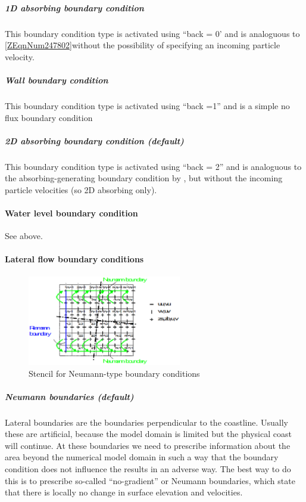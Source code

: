 \subparagraph{1D absorbing boundary condition }

This boundary condition type is activated using ``back = 0' and is analoguous to \eqref{ZEqnNum247802}without the possibility of specifying an incoming particle velocity.

\subparagraph{Wall boundary condition}

This boundary condition type is activated using ``back =1'' and is a simple no flux boundary condition

\subparagraph{2D absorbing boundary condition (default)}

This boundary condition type is activated using ``back = 2'' and is analoguous to the absorbing-generating boundary condition by \citet{VanDongeren1997}, but without the incoming particle velocities (so 2D absorbing only). 

\paragraph{Water level boundary condition}

See above.

\paragraph{Lateral flow boundary conditions}

\begin{figure}[h]
  \centering
  \includegraphics[width=0.6\textwidth]{image16}
  \caption{Stencil for Neumann-type boundary conditions}
  \label{fig:image16}
\end{figure}

\subparagraph{Neumann boundaries (default)}

Lateral boundaries are the boundaries perpendicular to the coastline. Usually these are artificial, because the model domain is limited but the physical coast will continue. At these boundaries we need to prescribe information about the area beyond the numerical model domain in such a way that the boundary condition does not influence the results in an adverse way. The best way to do this is to prescribe so-called ``no-gradient'' or Neumann boundaries, which state that there is locally no change in surface elevation and velocities.

